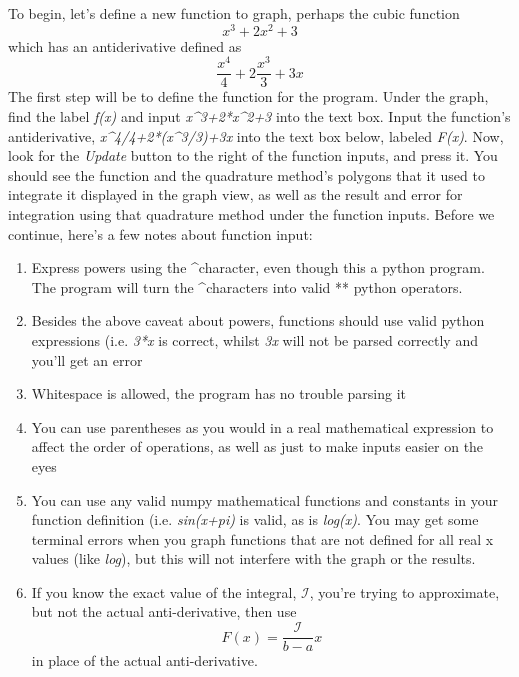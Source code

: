 \documentclass[12pt]{article}
\newcommand{\newLine}{\vspace{5mm}}
\begin{document}
\newLine To begin, let's define a new function to graph, perhaps the cubic function \begin{equation*}
	x^3 + 2x^2 + 3
\end{equation*} which has an antiderivative defined as
\begin{equation*}
	\frac{x^4}{4} + 2\frac{x^3}{3} + 3x
\end{equation*}
The first step will be to define the function for the program. Under the graph, find the label \emph{f(x)} and input \emph{x\textasciicircum 3+2*x\textasciicircum 2+3} into the text box. Input the function's antiderivative, \emph{x\textasciicircum 4/4+2*(x\textasciicircum 3/3)+3x} into the text box below, labeled \emph{F(x)}. Now, look for the \emph{Update} button to the right of the function inputs, and press it. You should see the function and the quadrature method's polygons that it used to integrate it displayed in the graph view, as well as the result and error for integration using that quadrature method under the function inputs. Before we continue, here's a few notes about function input:
\begin{enumerate}[\indent 1.]
\item Express powers using the \textasciicircum character, even though this a python program. The program will turn the \textasciicircum characters into valid ** python operators.
\item Besides the above caveat about powers, functions should use valid python expressions (i.e. \emph{3*x} is correct, whilst \emph{3x} will not be parsed correctly and you'll get an error
\item Whitespace is allowed, the program has no trouble parsing it
\item You can use parentheses as you would in a real mathematical expression to affect the order of operations, as well as just to make inputs easier on the eyes
\item You can use any valid numpy mathematical functions and constants in your function definition (i.e. \emph{sin(x+pi)} is valid, as is \emph{log(x)}. You may get some terminal errors when you graph functions that are not defined for all real x values (like \emph{log}), but this will not interfere with the graph or the results.
\item If you know the exact value of the integral, $\mathcal{I}$, you're trying to approximate, but not the actual anti-derivative, then use \begin{equation*} F(x) = \frac{\mathcal{I}}{b - a}x \end{equation*}
in place of the actual anti-derivative.
\end{enumerate}
\end{document}
